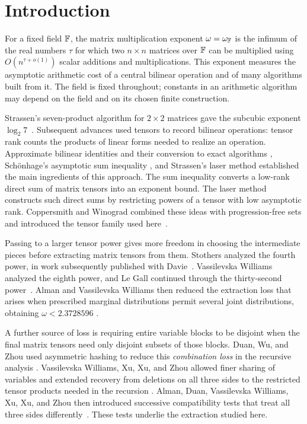 \section{Introduction}\label{sec:introduction}

For a fixed field $\mathbb F$, the matrix multiplication exponent
$\omega=\omega_\mathbb F$ is the infimum of the real numbers $\tau$ for which
two $n\times n$ matrices over $\mathbb F$ can be multiplied using
$O(n^{\tau+o(1)})$ scalar additions and multiplications.  This exponent
measures the asymptotic arithmetic cost of a central bilinear operation
and of many algorithms built from it.  The field is fixed throughout;
constants in an arithmetic algorithm may depend on the field and on its
chosen finite construction.

Strassen's seven-product algorithm for $2\times2$ matrices gave the
subcubic exponent $\log_2 7$~\cite{Strassen1969}.  Subsequent advances
used tensors to record bilinear operations: tensor rank counts the
products of linear forms needed to realize an operation.  Approximate
bilinear identities and their conversion to exact algorithms
\cite{Bini1980}, Sch\"onhage's asymptotic sum inequality
\cite{Schonhage1981}, and Strassen's laser method
\cite{Strassen1987} established the main ingredients of this approach.
The sum inequality converts a low-rank direct sum of matrix tensors into
an exponent bound.  The laser method constructs such direct sums by
restricting powers of a tensor with low asymptotic rank.  Coppersmith and
Winograd combined these ideas with progression-free sets and introduced
the tensor family used here~\cite{CoppersmithWinograd1990}.

Passing to a larger tensor power gives more freedom in choosing the
intermediate pieces before extracting matrix tensors from them.
Stothers analyzed the fourth power, in work subsequently published with
Davie~\cite{Stothers2010,DavieStothers2013}.  Vassilevska Williams
analyzed the eighth power, and Le Gall continued through the
thirty-second power~\cite{VassilevskaWilliams2012,LeGall2014}.
Alman and Vassilevska Williams then reduced the extraction loss that
arises when prescribed marginal distributions permit several joint
distributions, obtaining $\omega<2.3728596$
\cite{AlmanWilliams2024}.

A further source of loss is requiring entire variable blocks to be
disjoint when the final matrix tensors need only disjoint subsets of
those blocks.  Duan, Wu, and Zhou used asymmetric hashing to reduce this
\emph{combination loss} in the recursive analysis
\cite{DuanWuZhou2023}.  Vassilevska Williams, Xu, Xu, and Zhou allowed
finer sharing of variables and extended recovery from deletions on all
three sides to the restricted tensor products needed in the recursion
\cite{VXXZ2023}.  Alman, Duan, Vassilevska Williams, Xu, Xu, and Zhou
then introduced successive compatibility tests that treat all three
sides differently~\cite{MoreAsymmetry2026}.  These tests underlie the
extraction studied here.

